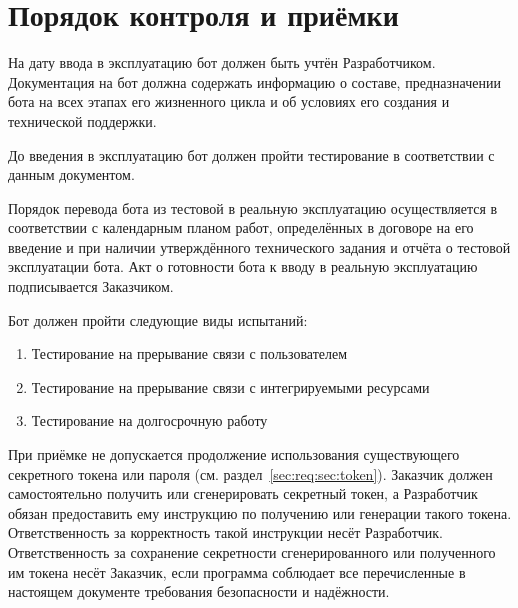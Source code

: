 \section{Порядок контроля и приёмки}
\label{sec:test}
На дату ввода в эксплуатацию бот должен быть учтён Разработчиком.
Документация на бот должна содержать информацию о составе,
предназначении бота на всех этапах его жизненного цикла и
об условиях его создания и технической поддержки.

До введения в эксплуатацию бот должен пройти тестирование в соответствии с данным документом.

Порядок перевода бота из тестовой в реальную эксплуатацию осуществляется в соответствии
с календарным планом работ, определённых в договоре на его введение и при наличии
утверждённого технического задания и отчёта о тестовой эксплуатации бота.
Акт о готовности бота к вводу в реальную эксплуатацию подписывается Заказчиком.

Бот должен пройти следующие виды испытаний:
\begin{enumerate}
    \item
        Тестирование на прерывание связи с пользователем
    \item
        Тестирование на прерывание связи с интегрируемыми ресурсами
    \item
        Тестирование на долгосрочную работу
\end{enumerate}

При приёмке не допускается продолжение использования существующего секретного токена или пароля
(см. раздел~\ref{sec:req:sec:token}). Заказчик должен самостоятельно получить или
сгенерировать секретный токен, а Разработчик обязан предоставить ему инструкцию по
получению или генерации такого токена. Ответственность за корректность такой инструкции
несёт Разработчик. Ответственность за сохранение секретности сгенерированного или полученного им
токена несёт Заказчик, если программа соблюдает все перечисленные в настоящем документе требования
безопасности и надёжности.
